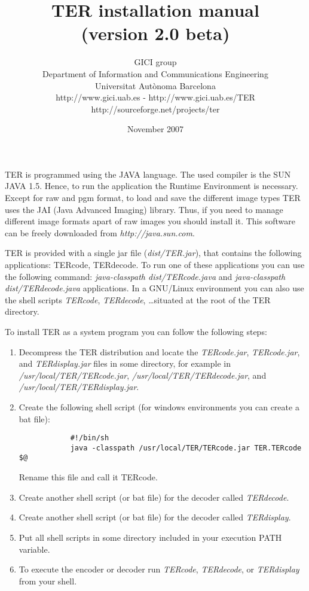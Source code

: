 \documentclass[a4paper,10pt]{article}
\title{TER installation manual \\ \small (version 2.0 beta)}
\author{
GICI group \vspace{0.1cm} \\
\small Department of Information and Communications Engineering \\
\small Universitat Aut{\`o}noma Barcelona \\
\small http://www.gici.uab.es  -  http://www.gici.uab.es/TER \\
\small http://sourceforge.net/projects/ter \\
}
\date{November 2007}
\begin{document}
\maketitle

	TER is programmed using the JAVA language. The used compiler is the
	SUN JAVA 1.5. Hence, to run the application the Runtime Environment
	is necessary. Except for raw and pgm format,
	to load and save the different image types TER uses 
	the JAI (Java Advanced Imaging) library. Thus, if you need to
	manage different image formats apart of raw images you should
	install it. This software can be freely downloaded from
	\emph{http://java.sun.com}. 

	TER is provided with a single jar file (\emph{dist/TER.jar}), that
	contains the following applications: TERcode, TERdecode. To run one
	of these applications you can use the following command: 
	\emph{java-classpath dist/TERcode.java} and 
	\emph{java-classpath dist/TERdecode.java}
	applications. In a GNU/Linux environment you can also use the shell
	scripts \emph{TERcode}, \emph{TERdecode}, \ldots situated at the
	root of the TER directory. 

	To install TER as a system program you can follow the following
	steps: 

	\begin{enumerate}
		\item Decompress the TER distribution and locate the
		\emph{TERcode.jar}, \emph{TERcode.jar}, and \emph{TERdisplay.jar}
		files in some directory, for example in
		\emph{/usr/local/TER/TERcode.jar},
		\emph{/usr/local/TER/TERdecode.jar}, and
		\emph{/usr/local/TER/TERdisplay.jar}.
		\item Create the following shell script (for windows
		environments you can create a bat file): 
			\begin{verbatim}
			#!/bin/sh
			java -classpath /usr/local/TER/TERcode.jar TER.TERcode $@ 
			\end{verbatim}
			Rename this file and call it TERcode.
		\item Create another shell script (or bat file) for the decoder
		called \emph{TERdecode}.
		\item Create another shell script (or bat file) for the decoder
		called \emph{TERdisplay}. 
		\item Put all shell scripts in some directory included in your
		execution PATH variable. 
		\item To execute the encoder or decoder run \emph{TERcode},
		\emph{TERdecode}, or \emph{TERdisplay} from your shell. 
	\end{enumerate}
\end{document}
